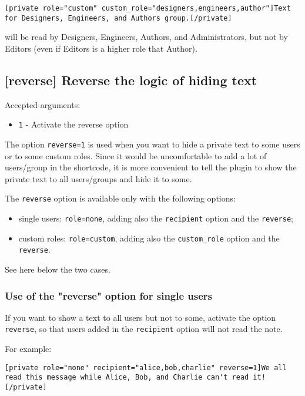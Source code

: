 \documentclass[a4paper,10pt]{article}
\begin{document}
\begin{lstlisting}
[private role="custom" custom_role="designers,engineers,author"]Text for Designers, Engineers, and Authors group.[/private]
\end{lstlisting}

will be read by Designers, Engineers, Authors, and Administrators, but not by Editors (even if Editors is a higher role that Author).

\subsection{[reverse] Reverse the logic of hiding text}

Accepted arguments:

\begin{itemize}
 \item \verb+1+ - Activate the reverse option
\end{itemize}


The option \verb+reverse=1+ is used when you want to hide a private text to some users or to some custom roles. Since it would be uncomfortable to add a lot of users/group in the shortcode, it is more convenient to tell the plugin to show the private text to all users/groups and hide it to some.

The \verb+reverse+ option is available only with the following options:

\begin{itemize}
 \item single users: \verb+role=none+, adding also the \verb+recipient+ option and the \verb+reverse+;
 \item custom roles: \verb+role=custom+, adding also the \verb+custom_role+ option and the \verb+reverse+.
\end{itemize}

See here below the two cases.

\subsubsection{Use of the "reverse" option for single users}

If you want to show a text to all users but not to some, activate the option \verb+reverse+, so that users added in the \verb+recipient+ option will not read the note.

For example:

\begin{lstlisting}
[private role="none" recipient="alice,bob,charlie" reverse=1]We all read this message while Alice, Bob, and Charlie can't read it![/private]
\end{lstlisting}
\end{document}

